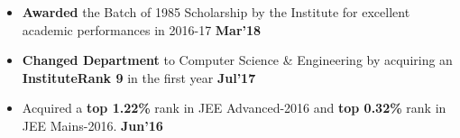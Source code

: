 \documentclass[10pt]{article}
\begin{document}
\begin{itemize}[leftmargin=*]
\item \textbf{Awarded} the Batch of 1985 Scholarship by the Institute for excellent academic performances in 2016-17 \href{https://github.com/shmundhra/Credentials/blob/master/Scholarships/Batch_of_1985_Scholarship.pdf} {\hspace{0.5ex}\footnotesize\faMousePointer} {\hfill}\textbf{Mar'18}\\[-1.8em]
\item \textbf{Changed Department} to Computer Science \& Engineering by acquiring an \textbf{InstituteRank 9} in the first year \href{https://github.com/shmundhra/Credentials/blob/master/Academics/DepartmentChange_IITKGP.pdf} {\hspace{0.5ex}\footnotesize\faMousePointer} {\hfill}\textbf{Jul'17}\\[-1.8em]
 \item Acquired a \textbf{top 1.22\%} rank in JEE Advanced-2016 and \textbf{top 0.32\%} rank in JEE Mains-2016. \href{https://github.com/shmundhra/Credentials/blob/master/Academics/JEE.png} {\hspace{0.5ex}\footnotesize\faMousePointer} {\hfill}\textbf{Jun'16}\\[-1.8em]
\end{itemize}
\end{document}
